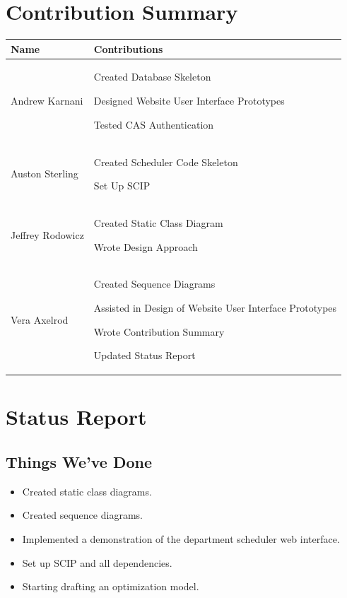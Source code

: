 \documentclass[11pt]{article}
\newenvironment{packed_itemize}{
\begin{itemize}
  \setlength{\itemsep}{1pt}
  \setlength{\parskip}{0pt}
  \setlength{\parsep}{0pt}
}{\end{itemize}}
\begin{document}
\section{Contribution Summary} %
\begin{tabular}{|m{1.4in}|m{4.4in}|}
\hline 
\textbf{\large Name}     & \textbf{\large Contributions} \\
\hline\hline

 Andrew Karnani
	&
	 \begin{packed_itemize}
		\item Created Database Skeleton
		\item Designed Website User Interface Prototypes
		\item Tested CAS Authentication
	\end{packed_itemize}
\\
\hline
 Auston Sterling
	&
	 \begin{packed_itemize}
	        \item Created Scheduler Code Skeleton
		  \item Set Up SCIP
	\end{packed_itemize}
\\
\hline
Jeffrey Rodowicz
	&
	 \begin{packed_itemize}
		\item Created Static Class Diagram
		\item Wrote Design Approach
	\end{packed_itemize}
\\
\hline
Vera Axelrod
	&
	 \begin{packed_itemize}
		\item Created Sequence Diagrams
		\item Assisted in Design of Website User Interface Prototypes
		\item Wrote Contribution Summary
		\item Updated Status Report
	\end{packed_itemize}
\\
\hline
\end{tabular}

\section{Status Report} %
\subsection{Things We've Done}
\begin{itemize}
	\item Created static class diagrams.
	\item Created sequence diagrams.
	\item Implemented a demonstration of the department scheduler web interface.
	\item Set up SCIP and all dependencies.
	\item Starting drafting an optimization model. 
\end{itemize}
\end{document}
